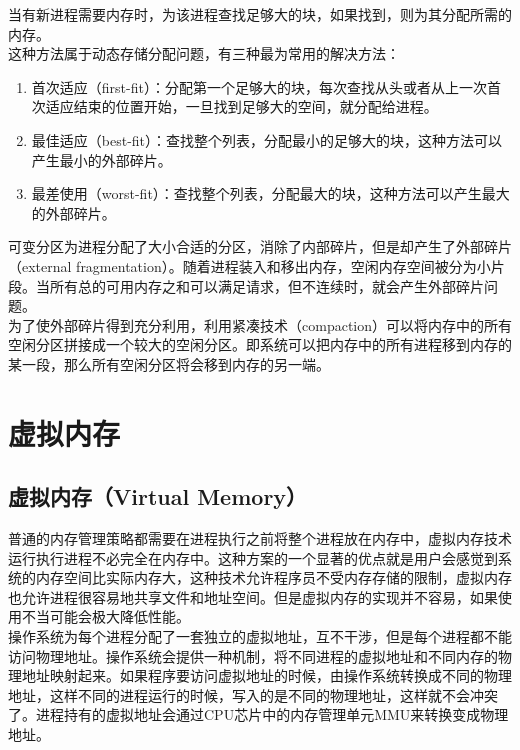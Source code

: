 当有新进程需要内存时，为该进程查找足够大的块，如果找到，则为其分配所需的内存。 \\

这种方法属于动态存储分配问题，有三种最为常用的解决方法：

\begin{enumerate}
	\item 首次适应（first-fit）：分配第一个足够大的块，每次查找从头或者从上一次首次适应结束的位置开始，一旦找到足够大的空间，就分配给进程。

	\item 最佳适应（best-fit）：查找整个列表，分配最小的足够大的块，这种方法可以产生最小的外部碎片。

	\item 最差使用（worst-fit）：查找整个列表，分配最大的块，这种方法可以产生最大的外部碎片。
\end{enumerate}

可变分区为进程分配了大小合适的分区，消除了内部碎片，但是却产生了外部碎片（external fragmentation）。随着进程装入和移出内存，空闲内存空间被分为小片段。当所有总的可用内存之和可以满足请求，但不连续时，就会产生外部碎片问题。 \\

为了使外部碎片得到充分利用，利用紧凑技术（compaction）可以将内存中的所有空闲分区拼接成一个较大的空闲分区。即系统可以把内存中的所有进程移到内存的某一段，那么所有空闲分区将会移到内存的另一端。

\newpage

\section{虚拟内存}

\subsection{虚拟内存（Virtual Memory）}

普通的内存管理策略都需要在进程执行之前将整个进程放在内存中，虚拟内存技术运行执行进程不必完全在内存中。这种方案的一个显著的优点就是用户会感觉到系统的内存空间比实际内存大，这种技术允许程序员不受内存存储的限制，虚拟内存也允许进程很容易地共享文件和地址空间。但是虚拟内存的实现并不容易，如果使用不当可能会极大降低性能。 \\

操作系统为每个进程分配了一套独立的虚拟地址，互不干涉，但是每个进程都不能访问物理地址。操作系统会提供一种机制，将不同进程的虚拟地址和不同内存的物理地址映射起来。如果程序要访问虚拟地址的时候，由操作系统转换成不同的物理地址，这样不同的进程运行的时候，写入的是不同的物理地址，这样就不会冲突了。进程持有的虚拟地址会通过CPU芯片中的内存管理单元MMU来转换变成物理地址。

